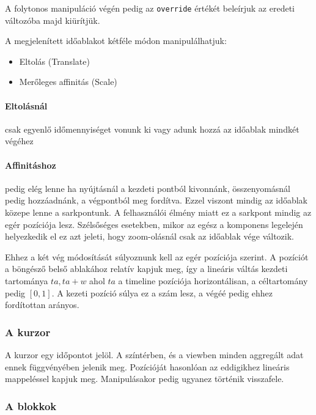 A folytonos manipuláció végén pedig az \lstinline[columns=fixed]{override} értékét beleírjuk az eredeti változóba majd kiürítjük.


A megjelenített időablakot kétféle módon manipulálhatjuk:

\begin{itemize}
	\item Eltolás (Translate)
	\item Merőleges affinitás (Scale)
\end{itemize}

\paragraph{Eltolásnál} csak egyenlő időmennyiséget vonunk ki vagy adunk hozzá az időablak mindkét végéhez

\paragraph{Affinitáshoz} pedig elég lenne ha nyújtásnál a kezdeti pontból kivonnánk, összenyomásnál pedig hozzáadnánk, a végpontból meg fordítva. Ezzel viszont mindig az időablak közepe lenne a sarkpontunk. A felhasználói élmény miatt ez a sarkpont mindig az egér pozíciója lesz. Szélsőséges esetekben, mikor az egész a komponens legelején helyezkedik el ez azt jeleti, hogy zoom-olásnál csak az időablak vége változik.

Ehhez a két vég módosítását súlyoznunk kell az egér pozíciója szerint. A pozíciót a böngésző belső ablakához relatív kapjuk meg, így a lineáris váltás kezdeti tartománya ${ta, ta + w}$ ahol $ta$ a timeline pozíciója horizontálisan, a céltartomány pedig $[0, 1]$. A kezeti pozíció súlya ez a szám lesz, a végéé pedig ehhez fordítottan arányos.

\subsubsection{A kurzor}

A kurzor egy időpontot jelöl. A színtérben, és a viewben minden aggregált adat ennek függvényében jelenik meg. Pozícióját hasonlóan az eddigikhez lineáris mappeléssel kapjuk meg. Manipulásakor pedig ugyanez történik visszafele.

\subsubsection{A blokkok}

